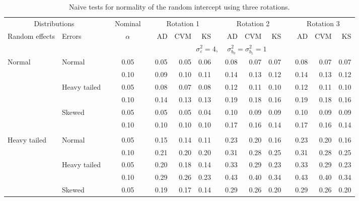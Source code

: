 \documentclass{article} %
\begin{document}
\begin{table}[ht]
\caption{Naive tests for normality of the random intercept using three rotations.}
\begin{scriptsize}
\begin{center}
\begin{tabular}{ll p{.1cm} c p{.1cm} rrr p{.1cm} rrr p{.1cm} rrr}
  \hline
  \multicolumn{2}{c}{Distributions}& & Nominal & &  \multicolumn{3}{c}{Rotation 1} & & \multicolumn{3}{c}{Rotation 2} & & \multicolumn{3}{c}{Rotation 3}\\ \cline{1-2} \cline{6-8} \cline{10-12} \cline{14-16}
  Random effects & Errors & & $\alpha$ & & AD & CVM & KS & & AD & CVM & KS & & AD & CVM & KS \\ 
   \hline
& && && \multicolumn{9}{c}{$\sigma_{\varepsilon}^2 = 4$, \ \ $\sigma_{b_0}^2 = \sigma_{b_1}^2 = 1$} \\ \cline{6-16}
Normal       & Normal       && 0.05 &&  0.05 & 0.05 & 0.06 && 0.08 & 0.07 & 0.07 && 0.08 & 0.07 & 0.07 \\ 
             &              && 0.10 &&  0.09 & 0.10 & 0.11 && 0.14 & 0.13 & 0.12 && 0.14 & 0.13 & 0.12 \\ 
             & Heavy tailed && 0.05 &&  0.08 & 0.07 & 0.08 && 0.12 & 0.11 & 0.10 && 0.12 & 0.11 & 0.10 \\ 
             &              && 0.10 &&  0.14 & 0.13 & 0.13 && 0.19 & 0.18 & 0.16 && 0.19 & 0.18 & 0.16 \\ 
             & Skewed       && 0.05 &&  0.05 & 0.05 & 0.04 && 0.10 & 0.09 & 0.09 && 0.10 & 0.09 & 0.09 \\ 
             &              && 0.10 &&  0.10 & 0.10 & 0.10 && 0.17 & 0.16 & 0.14 && 0.17 & 0.16 & 0.14 \\ 
             &&&&&&&&&&&&&&&\\
Heavy tailed & Normal       && 0.05 &&  0.15 & 0.14 & 0.11 && 0.23 & 0.20 & 0.16 && 0.23 & 0.20 & 0.16 \\ 
             &              && 0.10 &&  0.21 & 0.20 & 0.20 && 0.31 & 0.28 & 0.25 && 0.31 & 0.28 & 0.25 \\ 
             & Heavy tailed && 0.05 &&  0.20 & 0.18 & 0.14 && 0.33 & 0.29 & 0.23 && 0.33 & 0.29 & 0.23 \\ 
             &              && 0.10 &&  0.29 & 0.26 & 0.23 && 0.43 & 0.40 & 0.34 && 0.43 & 0.40 & 0.34 \\ 
             & Skewed       && 0.05 &&  0.19 & 0.17 & 0.14 && 0.29 & 0.26 & 0.20 && 0.29 & 0.26 & 0.20 \\ 

\end{tabular}
\end{center}
\end{scriptsize}
\end{table}
\end{document}
